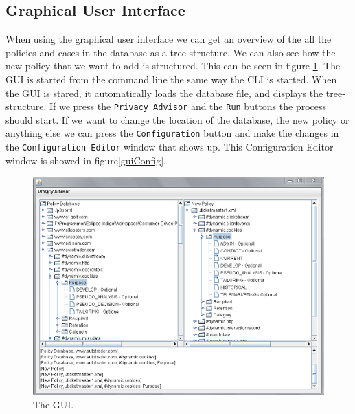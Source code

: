 \subsection{Graphical User Interface}
When using the graphical user interface we can get an overview of the all the policies and cases in the database as a tree-structure. We can also see how the new policy that we want to add is structured. This can be seen in figure \ref{guiFigure}. The GUI is started from the command line the same way the CLI is started. When the GUI is stared, it automatically loads the database file, and displays the tree-structure. If we press the \texttt{Privacy Advisor} and  the \texttt{Run} buttons the process should start. If we want to change the location of the database, the new policy or anything else we can press the \texttt{Configuration} button and make the changes in the \texttt{Configuration Editor} window that shows up. This Configuration Editor window is showed in figure\ref{guiConfig}.

\begin{centering}
  \begin{figure}
    \includegraphics{Documentation/gui.png}
    \caption{The GUI.}
    \label{guiFigure}
  \end{figure}
\end{centering}

